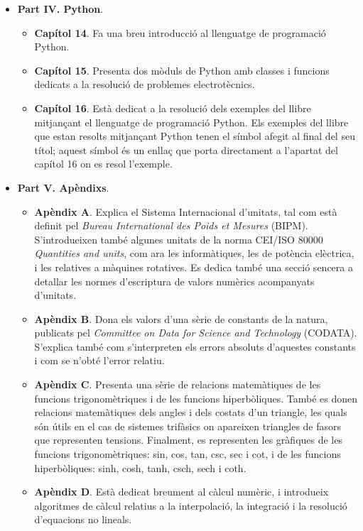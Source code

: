 \begin{itemize}
\begin{itemize}
		\end{itemize}
		\item \textbf{Part IV. Python}. 
		\begin{itemize}
			\item \textbf{Capítol 14}. Fa una breu introducció al llenguatge de programació Python.
			\item \textbf{Capítol 15}. Presenta dos mòduls de Python amb classes i funcions dedicats a la resolució de problemes electrotècnics.
			\item \textbf{Capítol 16}. Està dedicat  a la resolució dels exemples del llibre mitjançant el llenguatge de programació Python. Els exemples del llibre que estan resolts mitjançant Python tenen el símbol \faPython{} afegit al final del seu títol; aquest símbol és un enllaç que porta directament a l'apartat del capítol 16 on es resol l'exemple.
		\end{itemize}
		\item \textbf{Part V. Apèndixs}. 
		\begin{itemize}
			\item \textbf{Apèndix A}. Explica el Sistema Internacional d'unitats, tal com està definit pel \textit{Bureau International des Poids et Mesures} (BIPM). S'introdueixen també algunes unitats de la norma CEI/ISO 80000 \textit{Quantities and units}, com ara les informàtiques, les de potència elèctrica, i les relatives a màquines rotatives. Es dedica també una secció sencera a detallar les normes d'escriptura de valors numèrics acompanyats d'unitats.
			\item \textbf{Apèndix B}. Dona els valors d'una sèrie de constants de la natura,   publicats
			pel \textit{Committee on Data for
			Science and Technology} (CODATA). S'explica també com s'interpreten els errors absoluts d'aquestes constants i com se n'obté l'error relatiu.
			\item \textbf{Apèndix C}. Presenta una sèrie de relacions matemàtiques de les funcions trigonomètriques i de les funcions hiperbòliques. També es donen relacions matemàtiques dels angles i dels costats d'un triangle, les quals són útils en el cas de sistemes trifàsics on apareixen triangles de fasors que representen tensions. Finalment, es representen les gràfiques de les funcions trigonomètriques: sin, cos, tan, csc, sec i cot, i de les funcions hiperbòliques: sinh, cosh, tanh, csch, sech i coth.
			\item \textbf{Apèndix D}. Està dedicat breument al càlcul numèric, i introdueix algoritmes de càlcul relatius a la interpolació, la integració i la resolució d'equacions no lineals.

\end{itemize}
\end{itemize}
